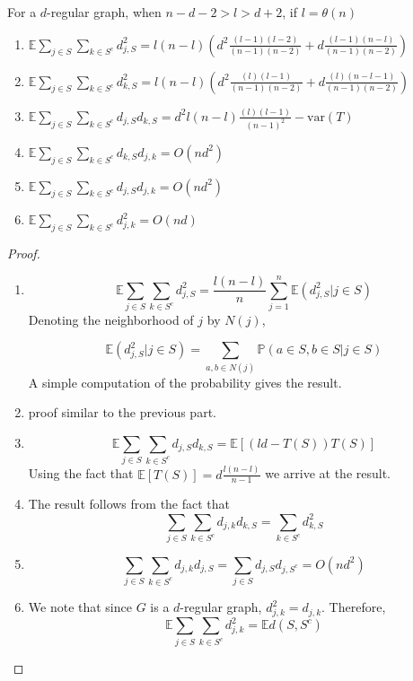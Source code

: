 \documentclass[final,12pt]{colt2018}
\begin{document}
\begin{lemma}
For a $d$-regular graph, when $n-d-2 > l > d + 2$, if $l = \theta(n)$
\begin{enumerate}
\item $\mathbb{E}\sum_{j\in S}\sum_{k\in S^c} d_{j,S}^2 = l(n-l)\left(d^2\frac{(l-1)(l-2)}{(n-1)(n-2)} + d\frac{(l-1)(n-l)}{(n-1)(n-2)}\right)$
\item $\mathbb{E}\sum_{j\in S}\sum_{k\in S^c} d_{k,S}^2  = l(n-l)\left(d^2\frac{(l)(l-1)}{(n-1)(n-2)} + d\frac{(l)(n-l -1)}{(n-1)(n-2)}\right)$
\item $\mathbb{E}\sum_{j\in S}\sum_{k\in S^c} d_{j,S}d_{k,S} = d^2l(n-l)\frac{(l)(l-1)}{(n-1)^2} - \mathrm{var}(T)$
\item $\mathbb{E}\sum_{j\in S}\sum_{k\in S^c} d_{k,S}d_{j,k} = O(nd^2)$
\item
$\mathbb{E}\sum_{j\in S}\sum_{k\in S^c} d_{j,S}d_{j,k} = O(nd^2)$
\item
$\mathbb{E}\sum_{j\in S}\sum_{k\in S^c} d_{j,k}^2 = O(nd)$
\end{enumerate}
\label{useful_moments}
\end{lemma}
\begin{proof}
\begin{enumerate}
\item
$$\mathbb{E}\sum_{j\in S}\sum_{k\in S^c} d_{j,S}^2 = \frac{l(n-l)}{n}\sum_{j=1}^{n}\mathbb{E}(d_{j,S}^2| j\in S)$$  
Denoting the neighborhood of $j$ by $N(j)$,

$$\mathbb{E}(d_{j,S}^2| j\in S) = \sum_{a,b \in N(j)} \mathbb{P}(a \in S, b\in S | j \in S)$$ 
A simple computation of the probability gives the result.
\item 
proof similar to the previous part.
\item 
$$\mathbb{E}\sum_{j\in S}\sum_{k\in S^c} d_{j,S}d_{k,S} = \mathbb{E}\left[\left(ld - T(S)\right)T(S)\right] $$
Using the fact that $\mathbb{E}\left[T(S)\right] = d\frac{l(n-l)}{n-1}$ we arrive at the result.
\item
The result follows from the fact that
$$\sum_{j\in S}\sum_{k\in S^c} d_{j,k}d_{k,S} =  \sum_{k\in S^c} d_{k,S}^2$$
\item 
 
$$\sum_{j\in S}\sum_{k\in S^c} d_{j,k}d_{j,S} = \sum_{j \in S} d_{j,S}d_{j,S^c} = O(nd^2)$$

\item 
We note that since $G$ is a $d$-regular graph, $d_{j,k}^2 = d_{j,k}$. Therefore,
$$\mathbb{E}\sum_{j\in S}\sum_{k\in S^c} d_{j,k}^2 = \mathbb{E}d(S,S^c)$$

\end{enumerate}
\end{proof}
\end{document}
